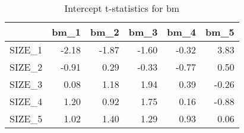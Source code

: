 \begin{table}[ht]
\centering
\caption{Intercept t-statistics for bm} 
\begin{tabular}{rrrrrr}
  \hline
 & bm\_1 & bm\_2 & bm\_3 & bm\_4 & bm\_5 \\ 
  \hline
SIZE\_1 & -2.18 & -1.87 & -1.60 & -0.32 & 3.83 \\ 
  SIZE\_2 & -0.91 & 0.29 & -0.33 & -0.77 & 0.50 \\ 
  SIZE\_3 & 0.08 & 1.18 & 1.94 & 0.39 & -0.26 \\ 
  SIZE\_4 & 1.20 & 0.92 & 1.75 & 0.16 & -0.88 \\ 
  SIZE\_5 & 1.02 & 1.40 & 1.29 & 0.93 & 0.06 \\ 
   \hline
\end{tabular}
\end{table}


